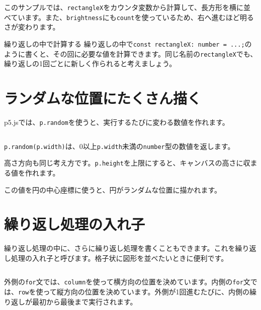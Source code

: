 このサンプルでは、\texttt{rectangleX}をカウンタ変数から計算して、長方形を横に並べています。また、\texttt{brightness}にも\texttt{count}を使っているため、右へ進むほど明るさが変わります。

\begin{pointbox}{繰り返しの中で計算する}
繰り返しの中で\texttt{const rectangleX: number = ...;}のように書くと、その回に必要な値を計算できます。同じ名前の\texttt{rectangleX}でも、繰り返しの1回ごとに新しく作られると考えましょう。
\end{pointbox}

\section{ランダムな位置にたくさん描く}

p5.jsでは、\texttt{p.random}を使うと、実行するたびに変わる数値を作れます。

\begin{listing}[htbp]
\inputminted{ts}{typescript-p5/listings/chapter07/random-circles.ts}
\caption{for文でランダムな位置に円を描く（\texttt{chapter07/random-circles.ts}）}
\label{lst:chapter07-random-circles}
\end{listing}

\texttt{p.random(p.width)}は、0以上\texttt{p.width}未満の\texttt{number}型の数値を返します。

高さ方向も同じ考え方です。\texttt{p.height}を上限にすると、キャンバスの高さに収まる値を作れます。

この値を円の中心座標に使うと、円がランダムな位置に描かれます。

\section{繰り返し処理の入れ子}

繰り返し処理の中に、さらに繰り返し処理を書くこともできます。これを繰り返し処理の入れ子と呼びます。格子状に図形を並べたいときに便利です。

\begin{listing}[htbp]
\inputminted{ts}{typescript-p5/listings/chapter07/grid-circles.ts}
\caption{for文の入れ子で円を格子状に並べる（\texttt{chapter07/grid-circles.ts}）}
\label{lst:chapter07-grid-circles}
\end{listing}

外側の\texttt{for}文では、\texttt{column}を使って横方向の位置を決めています。内側の\texttt{for}文では、\texttt{row}を使って縦方向の位置を決めています。外側が1回進むたびに、内側の繰り返しが最初から最後まで実行されます。

